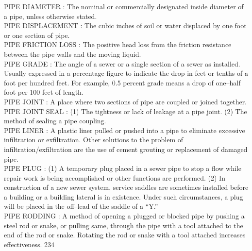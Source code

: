 \vspace{0.15cm}
PIPE DIAMETER :  The nominal or commercially designated inside diameter of a pipe, unless otherwise stated. \\
\vspace{0.15cm}
PIPE DISPLACEMENT :  The cubic inches of soil or water displaced by one foot or one section of pipe. \\
\vspace{0.15cm}
PIPE FRICTION LOSS :   The positive head loss from the friction resistance between the pipe walls and the moving liquid.\\
\vspace{0.15cm}
PIPE GRADE :  The angle of a sewer or a single section of a sewer as installed. Usually expressed in a percentage figure to indicate the drop in feet or tenths of a foot per hundred feet. For example, 0.5 percent grade means a drop of one–half foot per 100 feet of length. \\
\vspace{0.15cm}
PIPE JOINT :  A place where two sections of pipe are coupled or joined together. \\
\vspace{0.15cm}
PIPE JOINT SEAL :  (1) The tightness or lack of leakage at a pipe joint. (2) The method of sealing a pipe coupling. \\
\vspace{0.15cm}
PIPE LINER :  A plastic liner pulled or pushed into a pipe to eliminate excessive infiltration or exfiltration. Other solutions to the problem of infiltration/exfiltration are the use of cement grouting or replacement of damaged pipe. \\
\vspace{0.15cm}
PIPE PLUG :  (1) A temporary plug placed in a sewer pipe to stop a flow while repair work is being accomplished or other functions are performed. (2) In construction of a new sewer system, service saddles are sometimes installed before a building or a building lateral is in existence. Under such circumstances, a plug will be placed in the off–lead of the saddle of a “Y.” \\
\vspace{0.15cm}
PIPE RODDING :  A method of opening a plugged or blocked pipe by pushing a steel rod or snake, or pulling same, through the pipe with a tool attached to the end of the rod or snake. Rotating the rod or snake with a tool attached increases effectiveness. 234 \\
\vspace{0.15cm}

